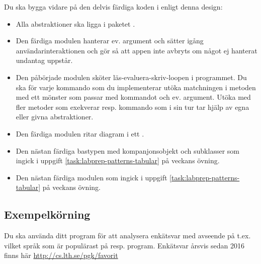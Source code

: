 Du ska bygga vidare på den delvis färdiga koden i  enligt denna design:
\begin{itemize}

\item Alla abstraktioner ska ligga i paketet .

\item Den färdiga modulen  hanterar ev. argument och sätter igång användarinteraktionen och gör så att appen inte avbryts om något ej hanterat undantag uppstår.

\item Den påbörjade modulen  sköter läs-evaluera-skriv-loopen i programmet. Du ska för varje kommando som du implementerar utöka matchningen i metoden  med ett mönster som passar med kommandot och ev. argument. Utöka  med fler metoder som exekverar resp. kommando som i sin tur tar hjälp av egna eller givna abstraktioner.

\item Den färdiga modulen  ritar diagram i ett .

\item Den nästan färdiga bastypen  med kompanjonsobjekt och subklasser som ingick i uppgift \ref{task:labprep-patterns-tabular} på veckans övning.

\item Den nästan färdiga modulen  som ingick i uppgift \ref{task:labprep-patterns-tabular} på veckans övning.
\end{itemize}

\subsection{Exempelkörning}

Du ska använda ditt program för att analysera enkätsvar med avseende på t.ex. vilket språk som är populärast på resp. program. Enkätsvar årsvis sedan 2016 finns här \url{http://cs.lth.se/pgk/favorit}

